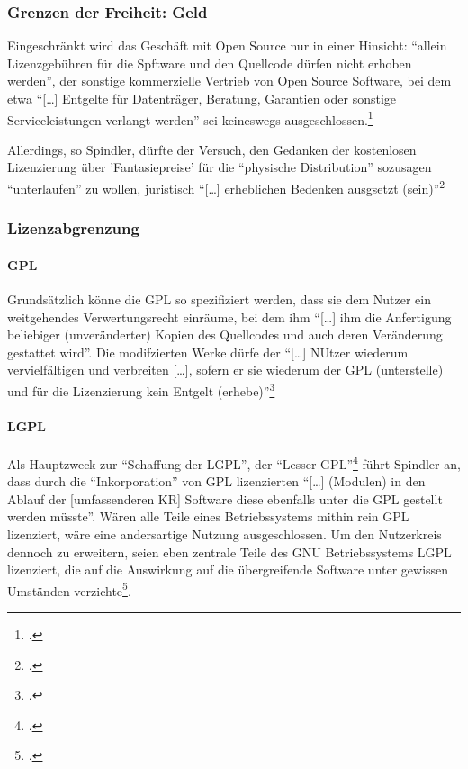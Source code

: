 \documentclass[DIV=calc,BCOR=5mm,11pt,headings=small,oneside,abstract=true, toc=bib]{scrartcl}
\begin{document}
\subsubsection{Grenzen der Freiheit: Geld}

Eingeschränkt wird das Geschäft mit Open Source nur in einer Hinsicht:
\enquote{allein Lizenzgebühren für die Spftware und den Quellcode dürfen
nicht erhoben werden}, der sonstige kommerzielle Vertrieb von Open Source
Software, bei dem etwa \enquote{[\ldots] Entgelte für Datenträger, Beratung,
Garantien oder sonstige Serviceleistungen verlangt werden} sei keineswegs
ausgeschlossen.\footcite[vgl.][5]{Spindler2004a}

Allerdings, so Spindler, dürfte der Versuch, den Gedanken der kostenlosen
Lizenzierung über 'Fantasiepreise' für die \enquote{physische Distribution}
sozusagen \enquote{unterlaufen} zu wollen, juristisch \enquote{[\ldots]
erheblichen Bedenken ausgsetzt (sein)}\footcite[vgl.][6]{Spindler2004a}

\subsubsection{Lizenzabgrenzung}

\paragraph{GPL}

Grundsätzlich könne die GPL so spezifiziert werden, dass sie dem Nutzer ein
weitgehendes Verwertungsrecht einräume, bei dem ihm \enquote{[\ldots] ihm
die Anfertigung beliebiger (unveränderter) Kopien des Quellcodes und auch
deren Veränderung gestattet wird}. Die modifzierten Werke dürfe der
\enquote{[\ldots] NUtzer wiederum vervielfältigen und verbreiten [\ldots],
sofern er sie wiederum der GPL (unterstelle) und für die Lizenzierung
kein Entgelt (erhebe)}\footcite[vgl.][9]{Spindler2004a}

\paragraph{LGPL}

Als Hauptzweck zur \enquote{Schaffung der LGPL}, der \enquote{Lesser
GPL}\footcite[vgl.][10]{Spindler2004a} führt Spindler an, dass durch die
\enquote{Inkorporation} von GPL lizenzierten \enquote{[\ldots] (Modulen) in
den Ablauf der [umfassenderen KR] Software diese ebenfalls unter die GPL
gestellt werden müsste}. Wären alle Teile eines Betriebssystems mithin
rein GPL lizenziert, wäre eine andersartige Nutzung ausgeschlossen. Um den
Nutzerkreis dennoch zu erweitern, seien eben zentrale Teile des GNU
Betriebssystems LGPL lizenziert, die auf die Auswirkung auf die übergreifende
Software unter gewissen Umständen verzichte\footcite[vgl.][11]{Spindler2004a}.
\end{document}
